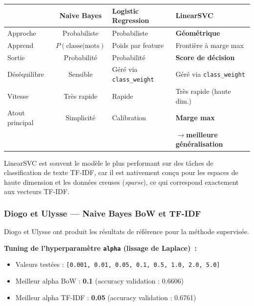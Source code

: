\documentclass[12pt,a4paper]{report}
\renewcommand{\arraystretch}{1}
\begin{document}
\begin{center}
\renewcommand{\arraystretch}{1}
\begin{tabular}{@{}lcC{3cm}C{5cm}@{}}
\toprule
 & \textbf{Naive Bayes} & \textbf{Logistic Regression} & \textbf{LinearSVC} \\
\midrule
Approche        & Probabiliste        & Probabiliste                  & \textbf{Géométrique} \\
\midrule
Apprend         & $P(\text{classe}|\text{mots})$ & Poids par feature & Frontière à marge max \\
\midrule
Sortie          & Probabilité         & Probabilité                   & \textbf{Score de décision} \\
\midrule
Déséquilibre    & Sensible            & Géré via \texttt{class\_weight} & Géré via \texttt{class\_weight} \\
\midrule
Vitesse         & Très rapide         & Rapide                        & Très rapide (haute dim.) \\
\midrule
Atout principal & Simplicité          & Calibration                   & \textbf{Marge max} \\
                &                     &                               & $\rightarrow$\textbf{meilleure généralisation} \\
\bottomrule
\end{tabular}
\end{center}

\begin{note}[Remarque]
LinearSVC est souvent le modèle le plus performant sur des tâches de classification de texte TF-IDF, car il est nativement conçu pour les espaces de haute dimension et les données creuses (\textit{sparse}), ce qui correspond exactement aux vecteurs TF-IDF.
\end{note}

\pagebreak
\subsubsection{Diogo et Ulysse --- Naive Bayes BoW et TF-IDF}

Diogo et Ulysse ont produit les résultats de référence pour la méthode supervisée.

\textbf{Tuning de l'hyperparamètre \texttt{alpha} (lissage de Laplace)~:}
\begin{itemize}
  \item Valeurs testées : \texttt{[0.001, 0.01, 0.05, 0.1, 0.5, 1.0, 2.0, 5.0]}
  \item Meilleur alpha BoW : \textbf{0.1} (accuracy validation : 0.6606)
  \item Meilleur alpha TF-IDF : \textbf{0.05} (accuracy validation : 0.6761)
\end{itemize}
\end{document}
